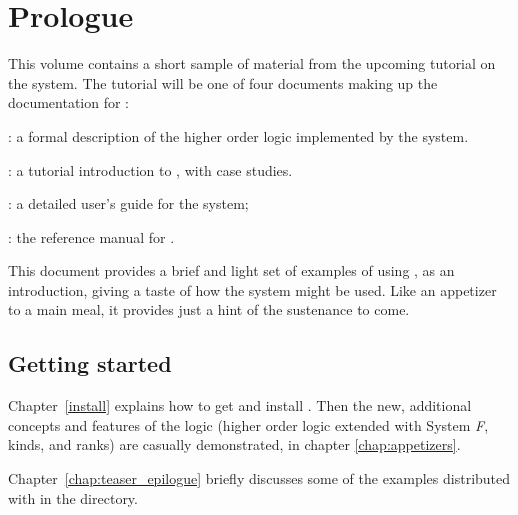\chapter*{Prologue}
\label{prologue}

This volume contains a short sample of material from the upcoming
tutorial on the \HOLW{} system.  The tutorial will be one of four
documents making up the documentation for \HOLW:

\begin{myenumerate}
\item \LOGIC: a formal description of the higher order logic
  implemented by the \HOLW{} system.
\item \TUTORIAL: a tutorial introduction to \HOLW, with case studies.
\item \DESCRIPTION: a detailed user's guide for the \HOLW{} system;
\item \REFERENCE: the reference manual for \HOLW.
\end{myenumerate}

This document provides a brief and light set of examples of using \HOLW{},
as an introduction, giving a taste of how the system might be used.
Like an appetizer to a main meal, it provides just a hint of
the sustenance to come.

\section*{Getting started}

Chapter~\ref{install} explains how to get and install \HOLW.
Then the new, additional
concepts and features of the \HOLW{} logic (higher order logic 
extended with System {\it F}, kinds, and ranks)
are casually demonstrated,
in chapter \ref{chap:appetizers}.

Chapter~\ref{chap:teaser_epilogue} briefly discusses some of the
examples distributed with \holnw{} in the  directory.



